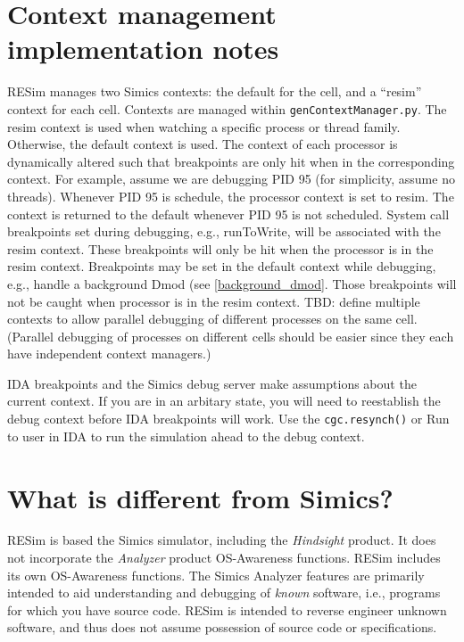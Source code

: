 \documentclass[titlepage]{article}
\begin{document}
\begin{appendices}
\section{Context management implementation notes}
RESim manages two Simics contexts: the default for the cell, and a ``resim'' context for each cell.
Contexts are managed within {\tt genContextManager.py}. The resim context is used when watching a specific process
or thread family.  Otherwise, the default context is used.  The context of each processor is dynamically altered 
such that breakpoints are only hit when in the corresponding context.  For example, assume we are debugging PID 95
(for simplicity, assume no threads).
Whenever PID 95 is schedule, the processor context is set to resim.  The context is returned to the default whenever
PID 95 is not scheduled.  System call breakpoints set during debugging, e.g., runToWrite, will be associated
with the resim context.  These breakpoints will only be hit when the processor is in the resim context. 
Breakpoints may be set in the default context while debugging, e.g., handle a background Dmod (see \ref{background_dmod}.  Those
breakpoints will not be caught when processor is in the resim context.
TBD: define multiple contexts to allow parallel debugging of different processes on the same cell.  (Parallel 
debugging of processes on different cells should be easier since they each have independent context managers.)

IDA breakpoints and the Simics debug server make assumptions about the current context.  If you are in an arbitary state, 
you will need to reestablish the debug context before IDA breakpoints will work.
Use the {\tt cgc.resynch()} or Run to user in IDA to run the simulation ahead to the debug context.

\section{What is different from Simics?}
RESim is based the Simics simulator, including the \textit{Hindsight} product.  It does not incorporate the \textit{Analyzer} product
OS-Awareness functions.  RESim includes its own OS-Awareness functions.  The Simics Analyzer features are primarily intended to aid
understanding and debugging of \textit{known} software, i.e., programs for which you have source code.  RESim is intended to reverse
engineer unknown software, and thus does not assume possession of source code or specifications.


\end{appendices}
\end{document}
